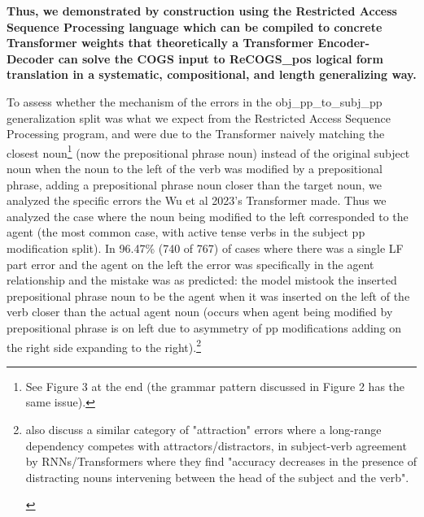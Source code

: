 \documentclass[11pt]{article}
\begin{document}
\textbf{Thus, we demonstrated by construction using the Restricted Access Sequence Processing language which can be compiled to concrete Transformer weights that theoretically a Transformer Encoder-Decoder can solve the COGS input to ReCOGS\_pos logical form translation in a systematic, compositional, and length generalizing way.}

To assess whether the mechanism of the errors in the obj\_pp\_to\_subj\_pp generalization split was what we expect from the Restricted Access Sequence Processing program, and were due to the Transformer naively matching the closest noun\footnote{
See Figure 3 at the end (the grammar pattern discussed in Figure 2 has the same issue).
} (now the prepositional phrase noun) instead of the original subject noun when the noun to the left of the verb was modified by a prepositional phrase, adding a prepositional phrase noun closer than the target noun, we analyzed the specific errors the Wu et al 2023's Transformer made. Thus we analyzed the case where the noun being modified to the left corresponded to the agent (the most common case, with active tense verbs in the subject pp modification split). In 96.47\% (740 of 767) of cases where there was a single LF part error and the agent on the left the error was specifically in the agent relationship and the mistake was as predicted: the model mistook the inserted prepositional phrase noun to be the agent when it was inserted on the left of the verb closer than the actual agent noun (occurs when agent being modified by prepositional phrase is on left due to asymmetry of pp modifications adding on the right side expanding to the right).\footnote{
\begin{tiny}
\cite{vanschijndel2019quantitydoesntbuyquality} also discuss a similar category of "attraction" errors where a long-range dependency competes with attractors/distractors, in subject-verb agreement by RNNs/Transformers where they find "accuracy decreases in the presence of distracting nouns intervening between the head of the subject and the verb".
\end{tiny}
}
\end{document}
